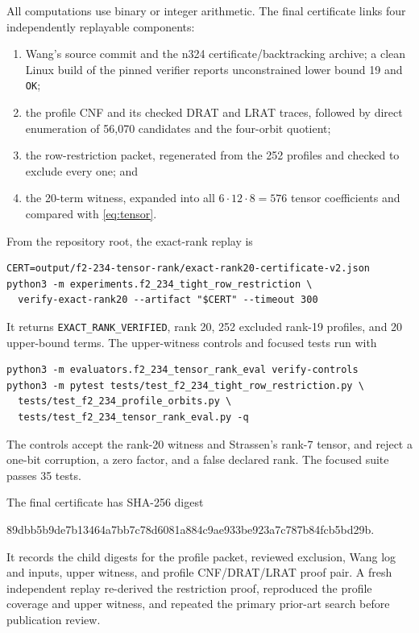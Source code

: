 \documentclass[10pt]{article}
\theoremstyle{remark}
\begin{document}
All computations use binary or integer arithmetic.  The final certificate
links four independently replayable components:
\begin{enumerate}
\item Wang's source commit and the n324 certificate/backtracking archive; a
      clean Linux build of the pinned verifier reports unconstrained lower
      bound 19 and \texttt{OK};
\item the profile CNF and its checked DRAT and LRAT traces, followed by direct
      enumeration of 56,070 candidates and the four-orbit quotient;
\item the row-restriction packet, regenerated from the 252 profiles and checked
      to exclude every one; and
\item the 20-term witness, expanded into all $6\cdot12\cdot8=576$ tensor
      coefficients and compared with \eqref{eq:tensor}.
\end{enumerate}

From the repository root, the exact-rank replay is
\begin{verbatim}
CERT=output/f2-234-tensor-rank/exact-rank20-certificate-v2.json
python3 -m experiments.f2_234_tight_row_restriction \
  verify-exact-rank20 --artifact "$CERT" --timeout 300
\end{verbatim}
It returns \texttt{EXACT\_RANK\_VERIFIED}, rank 20, 252 excluded rank-19
profiles, and 20 upper-bound terms.  The upper-witness controls and focused
tests run with
\begin{verbatim}
python3 -m evaluators.f2_234_tensor_rank_eval verify-controls
python3 -m pytest tests/test_f2_234_tight_row_restriction.py \
  tests/test_f2_234_profile_orbits.py \
  tests/test_f2_234_tensor_rank_eval.py -q
\end{verbatim}
The controls accept the rank-20 witness and Strassen's rank-7 tensor, and reject
a one-bit corruption, a zero factor, and a false declared rank.  The focused
suite passes 35 tests.

The final certificate has SHA-256 digest
\begin{center}
\footnotesize\ttfamily
89dbb5b9de7b13464a7bb7c78d6081a884c9ae933be923a7c787b84fcb5bd29b.
\end{center}
It records the child digests for the profile packet, reviewed exclusion, Wang
log and inputs, upper witness, and profile CNF/DRAT/LRAT proof pair.  A fresh
independent replay re-derived the restriction proof, reproduced the profile
coverage and upper witness, and repeated the primary prior-art search before
publication review.
\end{document}
